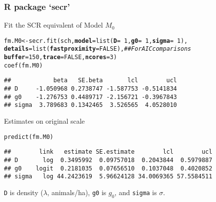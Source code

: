 \documentclass[color=usenames,dvipsnames]{beamer}\usepackage[]{graphicx}\usepackage[]{xcolor}
\makeatletter
\newcommand{\hlnum}[1]{\textcolor[rgb]{0.69,0.494,0}{#1}}%
\newcommand{\hlcom}[1]{\textcolor[rgb]{0.514,0.506,0.514}{\textit{#1}}}%
\newcommand{\hlopt}[1]{\textcolor[rgb]{0,0,0}{#1}}%
\newcommand{\hldef}[1]{\textcolor[rgb]{0,0,0}{#1}}%
\newcommand{\hlkwb}[1]{\textcolor[rgb]{0,0.341,0.682}{#1}}%
\newcommand{\hlkwc}[1]{\textcolor[rgb]{0,0,0}{\textbf{#1}}}%
\newcommand{\hlkwd}[1]{\textcolor[rgb]{0.004,0.004,0.506}{#1}}%
\newenvironment{kframe}{%
 \def\at@end@of@kframe{}%
 \ifinner\ifhmode%
  \def\at@end@of@kframe{\end{minipage}}%
  \begin{minipage}{\columnwidth}%
 \fi\fi%
 \def\FrameCommand##1{\hskip\@totalleftmargin \hskip-\fboxsep
 \colorbox{shadecolor}{##1}\hskip-\fboxsep
     \hskip-\linewidth \hskip-\@totalleftmargin \hskip\columnwidth}%
 \MakeFramed {\advance\hsize-\width
   \@totalleftmargin\z@ \linewidth\hsize
   \@setminipage}}%
 {\par\unskip\endMakeFramed%
 \at@end@of@kframe}
\newenvironment{knitrout}{}{} %
\let\hlstd\hldef
\newcommand{\inr}[1]{\colorbox{inlinecolor}{\texttt{#1}}}
\makeatother
\begin{document}
\begin{frame}[fragile]
  \frametitle{R package `secr'}
  Fit the SCR equivalent of Model $M_0$
\begin{knitrout}\scriptsize
{}\color{fgcolor}\begin{kframe}
\begin{alltt}
\hlstd{fm.M0} \hlkwb{<-} \hlkwd{secr.fit}\hlstd{(sch,} \hlkwc{model}\hlstd{=}\hlkwd{list}\hlstd{(}\hlkwc{D}\hlstd{=}\hlopt{~}\hlnum{1}\hlstd{,} \hlkwc{g0}\hlstd{=}\hlopt{~}\hlnum{1}\hlstd{,} \hlkwc{sigma}\hlstd{=}\hlopt{~}\hlnum{1}\hlstd{),}
    \hlkwc{details} \hlstd{=} \hlkwd{list}\hlstd{(}\hlkwc{fastproximity} \hlstd{=} \hlnum{FALSE}\hlstd{),} \hlcom{## For AIC comparisons}
    \hlkwc{buffer}\hlstd{=}\hlnum{150}\hlstd{,} \hlkwc{trace}\hlstd{=}\hlnum{FALSE}\hlstd{,} \hlkwc{ncores}\hlstd{=}\hlnum{3}\hlstd{)}
\hlkwd{coef}\hlstd{(fm.M0)}
\end{alltt}
\begin{verbatim}
##            beta   SE.beta       lcl        ucl
## D     -1.050968 0.2738747 -1.587753 -0.5141834
## g0    -1.276753 0.4489717 -2.156721 -0.3967843
## sigma  3.789683 0.1342465  3.526565  4.0528010
\end{verbatim}
\end{kframe}
\end{knitrout}
\pause
\vfill
Estimates on original scale
\begin{knitrout}\scriptsize
{}\color{fgcolor}\begin{kframe}
\begin{alltt}
\hlkwd{predict}\hlstd{(fm.M0)}
\end{alltt}
\begin{verbatim}
##        link   estimate SE.estimate        lcl        ucl
## D       log  0.3495992  0.09757018  0.2043844  0.5979887
## g0    logit  0.2181035  0.07656510  0.1037048  0.4020852
## sigma   log 44.2423619  5.96624128 34.0069365 57.5584511
\end{verbatim}
\end{kframe}
\end{knitrout}
\inr{D} is density ($\lambda$, animals/ha), \inr{g0} is $g_0$, and \inr{sigma} is 
$\sigma$.   
\end{frame}
\end{document}

